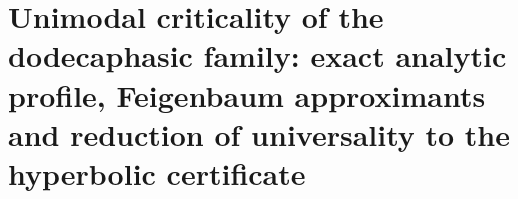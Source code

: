 \chapter{Unimodal criticality of the dodecaphasic family: exact analytic profile, Feigenbaum approximants and reduction of universality to the hyperbolic certificate}
\label{chap:p3-final:45:feigenbaum}




